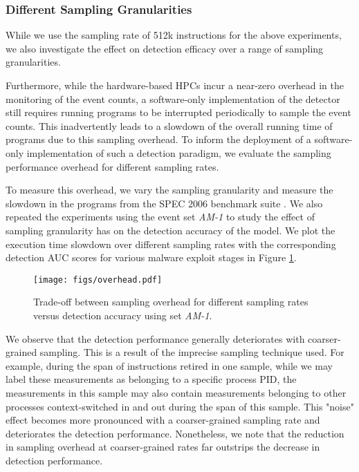 \documentclass{acm_proc_article-sp}
\begin{document}
\subsubsection{Different Sampling Granularities}
\label{sec:sampling_overhead}
While we use the sampling rate of 512k instructions for the above experiments, we also investigate the effect on detection efficacy over a range of sampling granularities.

Furthermore, while the hardware-based HPCs incur a near-zero overhead in the monitoring of the event counts, a software-only implementation of the detector still requires running programs to be interrupted periodically to sample the event counts. This inadvertently leads to a slowdown of the overall running time of programs due to this sampling overhead. To inform the deployment of a software-only implementation of such a detection paradigm, we evaluate the sampling performance overhead for different sampling rates.

To measure this overhead, we vary the sampling granularity and measure the slowdown in the programs from the SPEC 2006 benchmark suite \cite{Henning:2006:SCB:1186736.1186737}. We also repeated the experiments using the event set \textit{AM-1} to study the effect of sampling granularity has on the detection accuracy of the model. We plot the execution time slowdown over different sampling rates with the corresponding detection AUC scores for various malware exploit stages in Figure \ref{fig:samp_overhead}. 

\begin{figure}
  \centering
  \texttt{[image: figs/overhead.pdf]}
  \caption{Trade-off between sampling overhead for different sampling rates versus detection accuracy using set \textit{AM-1}.}
  \label{fig:samp_overhead}
\end{figure}

We observe that the detection performance generally deteriorates with coarser-grained sampling. This is a result of the imprecise sampling technique used. For example, during the span of instructions retired in one sample, while we may label these measurements as belonging to a specific process PID, the measurements in this sample may also contain measurements belonging to other processes context-switched in and out during the span of this sample. This "noise" effect becomes more pronounced with a coarser-grained sampling rate and deteriorates the detection performance. Nonetheless, we note that the reduction in sampling overhead at coarser-grained rates far outstrips the decrease in detection performance.
\end{document}
